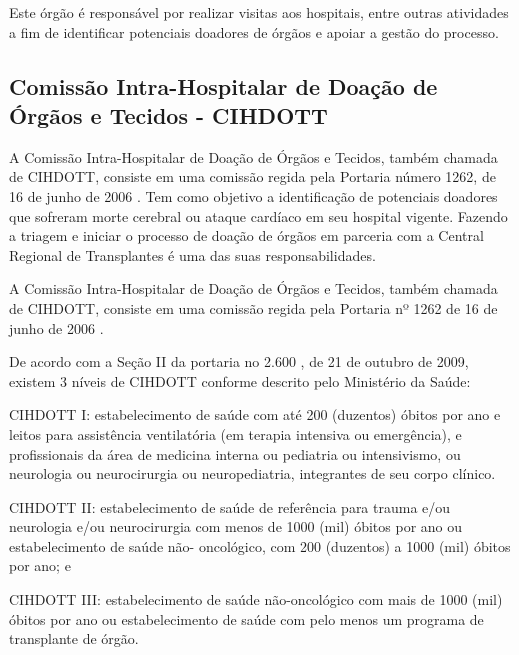 \documentclass[portuguese,oneside]{tcc}
\begin{document}
Este órgão é responsável por realizar visitas aos hospitais, entre outras atividades a fim de identificar potenciais doadores de órgãos e apoiar a gestão do processo\cite{HOSPITALSAOLUCAS}.   %

\subsection{Comissão Intra-Hospitalar de Doação de Órgãos e Tecidos - CIHDOTT}
A Comissão Intra-Hospitalar de Doação de Órgãos e Tecidos, também chamada de CIHDOTT, consiste em uma comissão regida pela Portaria número 1262, de 16 de junho de 2006 \cite{HCI}.
Tem como objetivo a identificação de potenciais doadores que sofreram morte cerebral ou ataque cardíaco em seu hospital vigente. Fazendo a triagem e iniciar o processo de doação de órgãos em parceria com a Central Regional de Transplantes é uma das suas responsabilidades.



A Comissão Intra-Hospitalar de Doação de Órgãos e Tecidos, também chamada de CIHDOTT, consiste em uma comissão regida pela Portaria nº 1262 de 16 de junho de 2006 \cite{HCI}.


De acordo com a Seção II da portaria no 2.600 \cite{PORTARIA}, de 21 de outubro de 2009, existem 3 níveis de CIHDOTT conforme descrito pelo Ministério da Saúde:

CIHDOTT I: estabelecimento de saúde com até 200 (duzentos) óbitos por ano e leitos para assistência ventilatória (em terapia intensiva ou emergência), e profissionais da área de medicina interna ou pediatria ou intensivismo, ou neurologia ou neurocirurgia ou neuropediatria, integrantes de seu corpo clínico.

CIHDOTT II: estabelecimento de saúde de referência para trauma e/ou neurologia e/ou neurocirurgia com menos de 1000 (mil) óbitos por ano ou estabelecimento de saúde não-
oncológico, com 200 (duzentos) a 1000 (mil) óbitos por ano; e

CIHDOTT III: estabelecimento de saúde não-oncológico com mais de 1000 (mil) óbitos por ano ou estabelecimento de saúde com pelo menos um programa de transplante de órgão.
\end{document}
